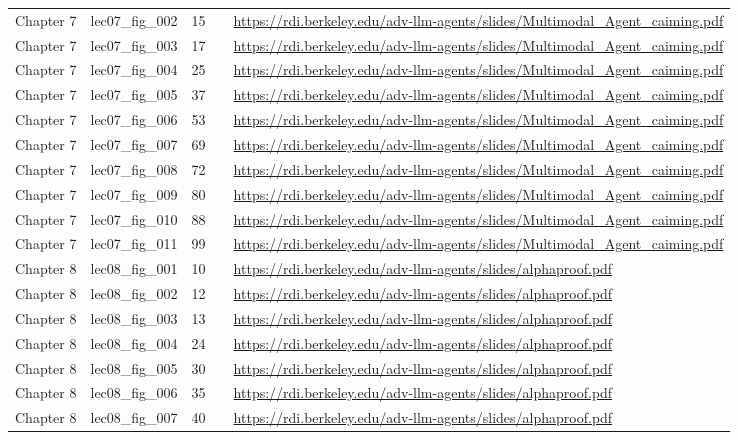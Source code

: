 \begin{longtable}{p{}p{}p{}p{}p{}}
Chapter 7 & lec07\_fig\_002 & 15 &  & \url{https://rdi.berkeley.edu/adv-llm-agents/slides/Multimodal_Agent_caiming.pdf} \\
Chapter 7 & lec07\_fig\_003 & 17 &  & \url{https://rdi.berkeley.edu/adv-llm-agents/slides/Multimodal_Agent_caiming.pdf} \\
Chapter 7 & lec07\_fig\_004 & 25 &  & \url{https://rdi.berkeley.edu/adv-llm-agents/slides/Multimodal_Agent_caiming.pdf} \\
Chapter 7 & lec07\_fig\_005 & 37 &  & \url{https://rdi.berkeley.edu/adv-llm-agents/slides/Multimodal_Agent_caiming.pdf} \\
Chapter 7 & lec07\_fig\_006 & 53 &  & \url{https://rdi.berkeley.edu/adv-llm-agents/slides/Multimodal_Agent_caiming.pdf} \\
Chapter 7 & lec07\_fig\_007 & 69 &  & \url{https://rdi.berkeley.edu/adv-llm-agents/slides/Multimodal_Agent_caiming.pdf} \\
Chapter 7 & lec07\_fig\_008 & 72 &  & \url{https://rdi.berkeley.edu/adv-llm-agents/slides/Multimodal_Agent_caiming.pdf} \\
Chapter 7 & lec07\_fig\_009 & 80 &  & \url{https://rdi.berkeley.edu/adv-llm-agents/slides/Multimodal_Agent_caiming.pdf} \\
Chapter 7 & lec07\_fig\_010 & 88 &  & \url{https://rdi.berkeley.edu/adv-llm-agents/slides/Multimodal_Agent_caiming.pdf} \\
Chapter 7 & lec07\_fig\_011 & 99 &  & \url{https://rdi.berkeley.edu/adv-llm-agents/slides/Multimodal_Agent_caiming.pdf} \\
Chapter 8 & lec08\_fig\_001 & 10 &  & \url{https://rdi.berkeley.edu/adv-llm-agents/slides/alphaproof.pdf} \\
Chapter 8 & lec08\_fig\_002 & 12 &  & \url{https://rdi.berkeley.edu/adv-llm-agents/slides/alphaproof.pdf} \\
Chapter 8 & lec08\_fig\_003 & 13 &  & \url{https://rdi.berkeley.edu/adv-llm-agents/slides/alphaproof.pdf} \\
Chapter 8 & lec08\_fig\_004 & 24 &  & \url{https://rdi.berkeley.edu/adv-llm-agents/slides/alphaproof.pdf} \\
Chapter 8 & lec08\_fig\_005 & 30 &  & \url{https://rdi.berkeley.edu/adv-llm-agents/slides/alphaproof.pdf} \\
Chapter 8 & lec08\_fig\_006 & 35 &  & \url{https://rdi.berkeley.edu/adv-llm-agents/slides/alphaproof.pdf} \\
Chapter 8 & lec08\_fig\_007 & 40 &  & \url{https://rdi.berkeley.edu/adv-llm-agents/slides/alphaproof.pdf} \\

\end{longtable}
